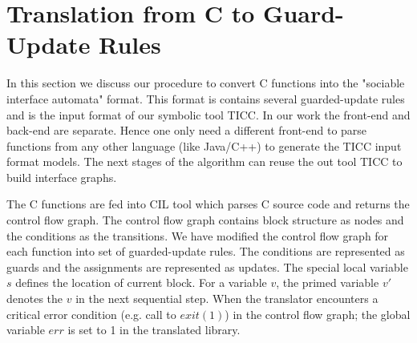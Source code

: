 \documentclass{llncs}
\begin{document}
\section{Translation from C to Guard-Update Rules}
In this section we discuss our procedure to convert C functions into the "sociable interface automata"
\cite{frocos05} format.
This format is contains several guarded-update rules and is the input format of our symbolic tool TICC.
In our work the front-end and back-end are separate.
Hence one only need a different front-end to parse functions from any other language (like Java/C++)
to generate the TICC input format models.
The next stages of the algorithm can reuse the out tool TICC to build interface graphs.

The C functions are fed into CIL\cite{CIL} tool which parses C source code and 
returns the control flow graph.
The control flow graph contains block structure as nodes and the conditions as the transitions.
We have modified the control flow graph for each function into set of guarded-update rules.
The conditions are represented as guards and the assignments are represented as updates.
The special local variable $s$ defines the location of current block.
For a variable $v$, the primed variable $v'$ denotes the $v$ in the next sequential step.  
When the translator encounters a critical error condition  (e.g. call to $exit(1)$) in the
control flow graph; the global variable $err$ is set to 1 in the translated library.  
\end{document}
